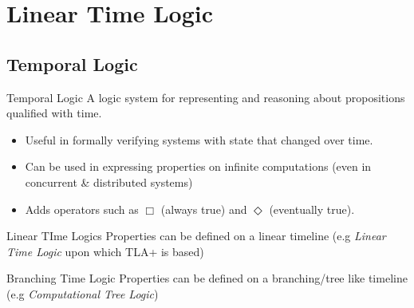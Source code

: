 \chapter{Linear Time Logic}
\section{Temporal Logic}
\begin{definitionbox}{Temporal Logic}
    A logic system for representing and reasoning about propositions qualified with time.
    \begin{itemize}
        \item Useful in formally verifying systems with state that changed over time.
        \item Can be used in expressing properties on infinite computations (even in concurrent \& distributed systems)
        \item Adds operators such as $\Box$ (always true) and $\Diamond$ (eventually true).
    \end{itemize}
\end{definitionbox}

\begin{tcbraster}[raster columns=2,raster equal height]
    \begin{definitionbox}{Linear TIme Logics}
        Properties can be defined on a linear timeline (e.g \textit{Linear Time Logic} upon which TLA+ is based)
    \end{definitionbox}
    \begin{definitionbox}{Branching Time Logic}
        Properties can be defined on a branching/tree like timeline (e.g \textit{Computational Tree Logic})
    \end{definitionbox}
\end{tcbraster}

